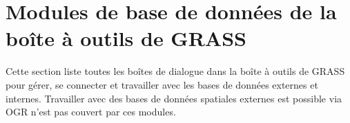 \section{Modules de base de données de la boîte à outils de GRASS}

Cette section liste toutes les boîtes de dialogue dans la boîte à outils de GRASS pour gérer, se connecter et travailler avec les bases de données externes et internes. Travailler avec des bases de données spatiales externes est possible via OGR n'est pas couvert par ces modules.


